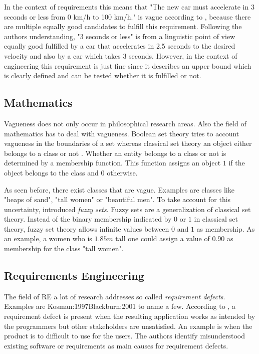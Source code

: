 In the context of requirements this means that "The new car must accelerate in 3 seconds or less from 0 km/h to 100 km/h." is vague according to \textcite{Braun:2007}, because there are multiple equally good candidates to fulfill this requirement.
Following the authors understanding, "3 seconds or less" is from a linguistic point of view equally good fulfilled by a car that accelerates in 2.5 seconds to the desired velocity and also by a car which takes 3 seconds.
However, in the context of engineering this requirement is just fine since it describes an upper bound which is clearly defined and can be tested whether it is fulfilled or not.

\subsection{Mathematics}
\label{chp:fundamentals:sec:vagueness:subsec:mathematics}
Vagueness does not only occur in philosophical research areas.
Also the field of mathematics has to deal with vagueness.
Boolean set theory tries to account vagueness in the boundaries of a set whereas classical set theory an object either belongs to a class or not \parencite{Fisher:2000}.
Whether an entity belongs to a class or not is determined by a membership function.
This function assigns an object $1$ if the object belongs to the class and $0$ otherwise.

As seen before, there exist classes that are vague.
Examples are classes like "heaps of sand", "tall women" or "beautiful men".
To take account for this uncertainty, \textcite{Zadeh:1965} introduced \textit{fuzzy sets}.
Fuzzy sets are a generalization of classical set theory.
Instead of the binary membership indicated by $0$ or $1$ in classical set theory, fuzzy set theory allows infinite values between $0$ and $1$ as membership.
As an example, a women who is $1.85m$ tall one could assign a value of $0.90$ as membership for the class "tall women".

\subsection{Requirements Engineering}
\label{chp:fundamentals:sec:vagueness:subsec:requirement_engineering}
The field of \ac{RE} a lot of research addresses so called \textit{requirement defects}.
Examples are \textcite{Lausen:2001}{Kosman:1997}{Blackburn:2001} to name a few.
According to \textcite{Lausen:2001}, a requirement defect is present when the resulting application works as intended by the programmers but other stakeholders are unsatisfied.
An example is when the product is to difficult to use for the users.
The authors identify misunderstood existing software or requirements as main causes for requirement defects.

